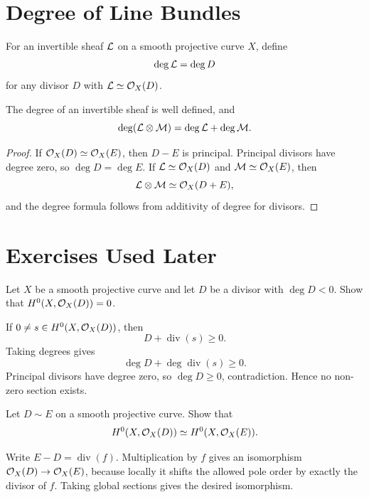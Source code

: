 \section{Degree of Line Bundles}

\begin{definition}
For an invertible sheaf \(\mathcal{L}\) on a smooth projective curve \(X\), define
\[
    \deg\mathcal{L}=\deg D
\]
for any divisor \(D\) with \(\mathcal{L}\simeq\mathcal{O}_X(D)\).
\end{definition}

\begin{proposition}
The degree of an invertible sheaf is well defined, and
\[
    \deg(\mathcal{L}\otimes\mathcal{M})=\deg\mathcal{L}+\deg\mathcal{M}.
\]
\end{proposition}

\begin{proof}
If \(\mathcal{O}_X(D)\simeq\mathcal{O}_X(E)\), then \(D-E\) is principal.  Principal divisors
have degree zero, so \(\deg D=\deg E\).  If
\(\mathcal{L}\simeq\mathcal{O}_X(D)\) and \(\mathcal{M}\simeq\mathcal{O}_X(E)\), then
\[
    \mathcal{L}\otimes\mathcal{M}\simeq\mathcal{O}_X(D+E),
\]
and the degree formula follows from additivity of degree for divisors.
\end{proof}

\section{Exercises Used Later}

\begin{exercise}\label{ex:negative-degree}
Let \(X\) be a smooth projective curve and let \(D\) be a divisor with
\(\deg D<0\).  Show that \(H^0(X,\mathcal{O}_X(D))=0\).
\end{exercise}

\begin{solution}
If \(0\ne s\in H^0(X,\mathcal{O}_X(D))\), then
\[
    D+\operatorname{div}(s)\ge0.
\]
Taking degrees gives
\[
    \deg D+\deg\operatorname{div}(s)\ge0.
\]
Principal divisors have degree zero, so \(\deg D\ge0\), contradiction.  Hence
no non-zero section exists.
\end{solution}

\begin{exercise}\label{ex:linearly-equivalent}
Let \(D\sim E\) on a smooth projective curve.  Show that
\[
    H^0(X,\mathcal{O}_X(D))\simeq H^0(X,\mathcal{O}_X(E)).
\]
\end{exercise}

\begin{solution}
Write \(E-D=\operatorname{div}(f)\).  Multiplication by \(f\) gives an
isomorphism \(\mathcal{O}_X(D)\to\mathcal{O}_X(E)\), because locally it shifts the allowed pole
order by exactly the divisor of \(f\).  Taking global sections gives the
desired isomorphism.
\end{solution}

